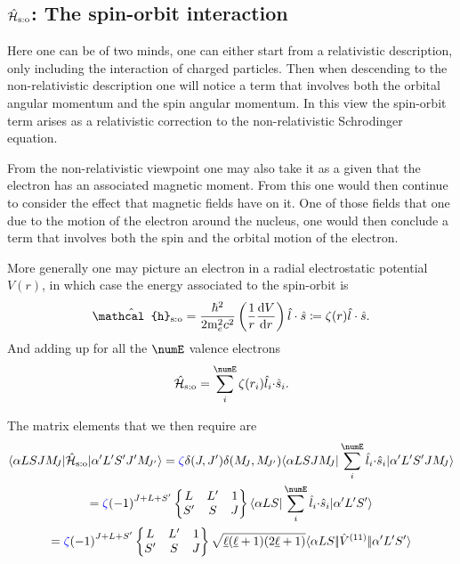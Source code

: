 \documentclass{article}
\begin{document}
\subsection{$\hat{\mathcal{H}}_\text{s:o}$: The spin-orbit interaction}

Here one can be of two minds, one can either start from a relativistic description, only including the interaction of charged particles. Then when descending to the non-relativistic description one will notice a term that involves both the orbital angular momentum and the spin angular momentum. In this view the spin-orbit term arises as a relativistic correction to the non-relativistic Schrodinger equation.

From the non-relativistic viewpoint one may also take it as a given that the electron has an associated magnetic moment. From this one would then continue to consider the effect that magnetic fields have on it. One of those fields that one due to the motion of the electron around the nucleus, one would then conclude a term that involves both the spin and the orbital motion of the electron.

More generally one may picture an electron in a radial electrostatic potential $V(r)$, in which case the energy associated to the spin-orbit is
\begin{equation}
    \hat{\mathcal{h}}_{\text{s:o}} = \frac{\hbar^2}{2\me^2 c^2} \left(\frac{1}{r}\frac{\mathrm{d}V}{\mathrm{d}r}\right)\op{l}\cdot{\op{s}} \DEF \zeta{(r)} \op{l}\cdot\op{s}.
\end{equation}
And adding up for all the $\numE$ valence electrons
\begin{equation}
\hamSpinOrbitSymbol = \sum_i^{\numE} \zeta(r_i) \dotp{\op{l}_i}{\op{s}_i}.
\end{equation}

The matrix elements that we then require are  
\begin{multline} 
    \braopket{\alpha LSJ \Msub{J} }{\hamSpinOrbitSymbol}{\alpha' L'S'J'\Msub{J'}} = 
    \spinZeta
    \kronecker{J}{J'}
    \kronecker{\Msub{J}}{\Msub{J'}}
    \braopket{\alpha LSJ \Msub{J} }{\sum_i^{\numE} \dotp{\op{l}_i}{\op{s}_i}}{\alpha' L'S'J\Msub{J}} \\ 
    = \spinZeta \phaser{J+L+S'} 
        \sixj{L}{L'}{1}{S'}{S}{J} 
        \braopket{\alpha LS}{\sum_i^{\numE} \dotp{\op{l}_i}{\op{s}_i}}{\alpha' L'S'} \\
    = \spinZeta \phaser{J+L+S'} 
        \sixj{L}{L'}{1}{S'}{S}{J} 
        \sqrt{\lorb (\lorb + 1)(2\lorb + 1)} 
        \redbraopket{\alpha{LS}}{\op{V}^{(11)}}{\alpha'L'S'} 
\end{multline}
\end{document}
